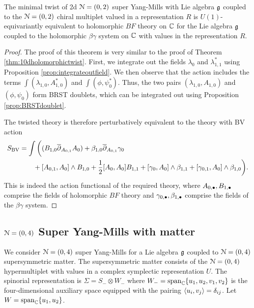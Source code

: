\documentclass[10pt, oneside]{article}
\begin{document}
\begin{thm} \label{2d(0,2)}
The minimal twist of 2d $\mathcal N=(0,2)$ super Yang-Mills with Lie algebra $\mathfrak g$ coupled to the $\mathcal N=(0,2)$ chiral multiplet valued in a representation $R$ is $U(1)$-equivariantly equivalent to holomorphic $BF$ theory on $\mathbb C$ for the Lie algebra $\mathfrak g$ coupled to the holomorphic $\beta\gamma$ system on $\mathbb C$ with values in the representation $R$. 
\end{thm}
\begin{proof}
The proof of this theorem is very similar to the proof of Theorem \ref{thm:10dholomorphictwist}.  
First, we integrate out the fields $\lambda_{0}$ and $\lambda_{1,1}^*$ using Proposition \ref{prop:integrateoutfield}.  
We then observe that the action includes the terms $\int  (\lambda_{1,0} , A_{1,0}^*)$ and  $\int (\phi, \psi_0^*)$.  
Thus, the two pairs $(\lambda_{1,0}, A_{1,0})$ and $(\phi, \psi_0)$ form BRST doublets, 
which can be integrated out using Proposition \ref{prop:BRSTdoublet}.  

The twisted theory is therefore perturbatively equivalent to the theory with BV action 
\begin{align*}
 S_{\mathrm{BV}} &= \int \bigg( (B_{1,0} \overline{\partial}_{A_{0,1}} A_{0})  + \beta_{1,0} \overline{\partial}_{A_{0,1}} \gamma_{0} \\ 
  &\qquad  + [A_{0,1}, A_0]\wedge B_{1,0} + \frac{1}{2}[A_0, A_0]B_{1,1} +  [\gamma_0, A_0]\wedge \beta_{1,1} + [\gamma_{0,1}, A_0]\wedge \beta_{1,0}  \bigg).
\end{align*}
This is indeed the action functional of the required theory, where $A_{0,\bullet}, B_{1,\bullet}$ comprise the fields of holomorphic $BF$ theory and $\gamma_{0,\bullet}, \beta_{1,\bullet}$ comprise the fields of the $\beta\gamma$ system.
\end{proof}

\subsection{\texorpdfstring{$\mathcal N=(0,4)$}{N=(0,4)} Super Yang-Mills with matter}

We consider $\mathcal N=(0,4)$ super Yang-Mills for a Lie algebra $\mathfrak g$ coupled to $\mathcal N=(0,4)$ supersymmetric matter. 
The supersymmetric matter consists of the $\mathcal N = (0,4)$ hypermultiplet with values in a complex symplectic representation $U$. 
The spinorial representation is $\Sigma = S_- \otimes W_-$ where $W_- = {\rm span}_{\mathbb C} \{u_1,u_2, v_1,v_2\}$ is the four-dimensional auxiliary space equipped with the pairing $\langle u_i, v_j\rangle = \delta_{ij}$. 
Let $W = {\rm span}_{\mathbb C} \{u_1,u_2\}$. 
\end{document}
